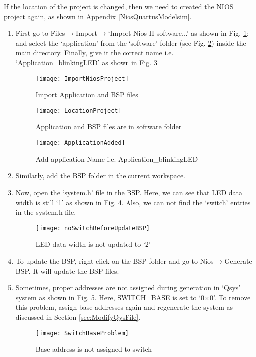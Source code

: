 \begin{noNumBox}
	If the location of the project is changed, then we need to created the NIOS project again, as shown in Appendix \ref{NiosQuartusModelsim}.
\end{noNumBox}
\begin{enumerate}
	\item First go to Files$\rightarrow$Import$\rightarrow$`Import Nios II software...' as shown in Fig. \ref{fig:ImportNiosProject}; and select the `application' from the `software' folder (see Fig. \ref{fig:LocationProject}) inside the main directory. Finally, give it the correct name i.e. `Application\_blinkingLED' as shown in Fig. \ref{fig:ApplicationAdded}
	\begin{figure}[!h]
		\centering
		\texttt{[image: ImportNiosProject]}
		\caption{Import Application and BSP files}
		\label{fig:ImportNiosProject}
	\end{figure}
	\begin{figure}[!h]
		\centering
		\texttt{[image: LocationProject]}
		\caption{Application and BSP files are in software folder}
		\label{fig:LocationProject}
	\end{figure}
	\begin{figure}[!h]
		\centering
		\texttt{[image: ApplicationAdded]}
		\caption{Add application Name i.e. Application\_blinkingLED}
		\label{fig:ApplicationAdded}
	\end{figure}
	\item Similarly, add the BSP folder in the current workspace. 
	\item Now, open the `system.h' file in the BSP. Here, we can see that LED data width is still `1' as shown in Fig. \ref{fig:noSwitchBeforeUpdateBSP}. Also, we can not find the `switch' entries in the system.h file. 
	\begin{figure}[!h]
		\centering
		\texttt{[image: noSwitchBeforeUpdateBSP]}
		\caption{LED data width is not updated to `2'}
		\label{fig:noSwitchBeforeUpdateBSP}
		\end{figure}
	\item To update the BSP, right click on the BSP folder and go to Nios$\rightarrow$Generate BSP. It will update the BSP files.
	\item Sometimes, proper addresses are not assigned during generation in `Qsys' system as shown in Fig. \ref{fig:SwitchBaseProblem}. Here, SWITCH\_BASE is set to `0$\times$0'. To remove this problem, assign base addresses again and regenerate the system as discussed in Section \ref{sec:ModifyQysFile}. 
	\begin{figure}[!h]
		\centering
		\texttt{[image: SwitchBaseProblem]}
		\caption{Base address is not assigned to switch}
		\label{fig:SwitchBaseProblem}
	\end{figure}	
\end{enumerate} 
		
